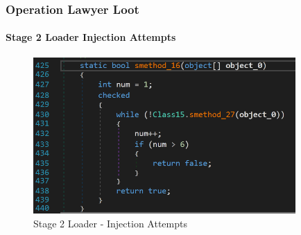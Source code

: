 \documentclass[aspectratio=169]{beamer}
\begin{document}
{
\begin{frame}
  \frametitle{Operation Lawyer Loot}
  \framesubtitle{Stage 2 Loader Injection Attempts}
  \begin{figure}
    \includegraphics[width=10cm]{injection-attempts}
    \caption{Stage 2 Loader - Injection Attempts}
  \end{figure}
\end{frame}
}
\end{document}
